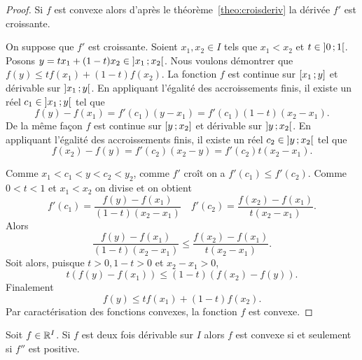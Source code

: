 \begin{proof}
  Si \(f\) est convexe alors d'après le théorème~\ref{theo:croisderiv}
  la dérivée \(f'\) est croissante.

  On suppose que \(f'\) est croissante. Soient \(x_1,x_2 \in I\) tels que
  \(x_1<x_2\) et \(t \in \left] 0 \, ; {} 1 \right[\). Posons \(y=tx_1+(1-t)x_2 \in
  \left] x_1 \, ; {} x_2 \right[\). Nous voulons démontrer que \(f(y) \leqslant
  tf(x_1)+(1-t)f(x_2)\). La fonction \(f\) est continue sur
  \(\left[ x_1 \, ; {} y \right]\) et dérivable sur \(\left] x_1 \, ; {} y \right[\). En
  appliquant l'égalité des accroissements finis, il existe un réel \(c_1 \in
  \left] x_1 \, ; {} y \right[\) tel que
  \begin{equation}
    f(y)-f(x_1)=f'(c_1)(y-x_1)=f'(c_1)(1-t)(x_2-x_1).
  \end{equation}
  De la même façon \(f\) est continue sur \(\left[ y \, ; {} x_2 \right]\) et dérivable
  sur \(\left] y \, ; {} x_2 \right[\). En appliquant l'égalité des accroissements
  finis, il existe un réel \(c_2 \in \left] y \, ; {} x_2 \right[\) tel que
  \begin{equation}
    f(x_2)-f(y)=f'(c_2)(x_2-y)=f'(c_2)t(x_2-x_1).
  \end{equation}

  Comme \(x_1<c_1<y<c_2<y_2\), comme \(f'\) croît on a \(f'(c_1) \leqslant
  f'(c_2)\). Comme \(0<t<1\) et \(x_1<x_2\) on divise et on obtient
  \begin{equation}
    f'(c_1) = \frac{f(y)-f(x_1)}{(1-t)(x_2-x_1)} \quad f'(c_2) =
    \frac{f(x_2)-f(x_1)}{t(x_2-x_1)}.
  \end{equation}
  Alors
  \begin{equation}
    \frac{f(y)-f(x_1)}{(1-t)(x_2-x_1)} \leqslant
    \frac{f(x_2)-f(x_1)}{t(x_2-x_1)}.
  \end{equation}
  Soit alors, puisque \(t>0, 1-t>0\) et \(x_2-x_1>0\),
  \begin{equation}
    t(f(y)-f(x_1)) \leqslant (1-t)(f(x_2)-f(y)).
  \end{equation}
  Finalement
  \begin{equation}
    f(y) \leqslant tf(x_1)+(1-t)f(x_2).
  \end{equation}
  Par caractérisation des fonctions convexes, la fonction \(f\) est convexe.
\end{proof}
\begin{corth}
  Soit \(f \in \mathbb{R}^I\). Si \(f\) est deux fois dérivable sur \(I\) alors \(f\)
  est convexe si et seulement si \(f''\) est positive.
\end{corth}

